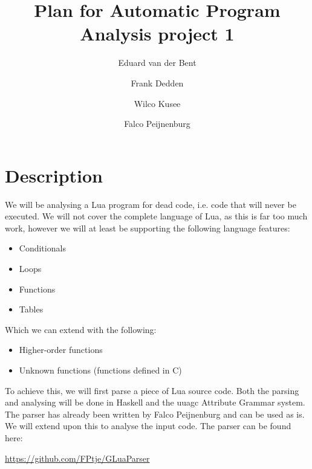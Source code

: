 \documentclass[10pt]{article}
\title{Plan for Automatic Program Analysis project 1}
\author{Eduard van der Bent \and Frank Dedden \and Wilco Kusee \and Falco Peijnenburg}
\begin{document}
\maketitle

\section*{Description}
We will be analysing a Lua program for dead code, i.e. code that will never be executed. We will not cover the complete language of Lua, as this is far too much work, however we will at least be supporting the following language features:
\begin{itemize}
	\item Conditionals
	\item Loops
	\item Functions
	\item Tables
\end{itemize}
Which we can extend with the following:
\begin{itemize}
	\item Higher-order functions
	\item Unknown functions (functions defined in C)
\end{itemize}
To achieve this, we will first parse a piece of Lua source code. Both the parsing and analysing will be done in Haskell and the uuagc Attribute Grammar system. The parser has already been written by Falco Peijnenburg and can be used as is. We will extend upon this to analyse the input code. The parser can be found here:

\url{https://github.com/FPtje/GLuaParser}
\end{document}
